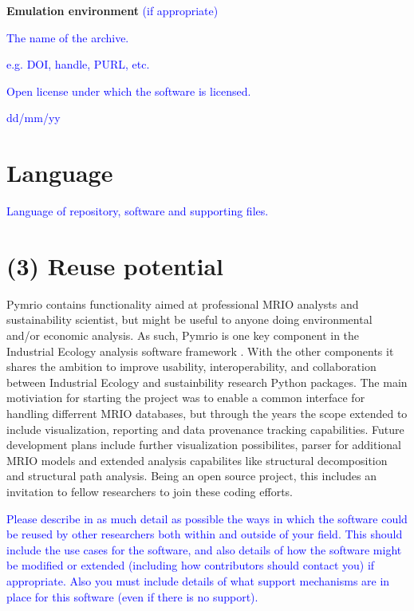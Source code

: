 \documentclass{jors}
\begin{document}
{{\bf Emulation environment} \textcolor{blue}{(if appropriate)}

\begin{description}[noitemsep,topsep=0pt]
	\item[Name:] \textcolor{blue}{The name of the archive.}
	\item[Persistent identifier:] \textcolor{blue}{e.g. DOI, handle, PURL, etc.}
	\item[Licence:] \textcolor{blue}{Open license under which the software is licensed.}
	\item[Date published:] \textcolor{blue}{dd/mm/yy}
\end{description}

\section*{Language}

\textcolor{blue}{Language of repository, software and supporting files.}

\section*{(3) Reuse potential}

Pymrio contains functionality aimed at professional MRIO analysts and sustainability scientist, but might be useful to anyone doing environmental and/or economic analysis. 
As such, Pymrio is one key component in the Industrial Ecology analysis software framework \cite{pauliuk2015}.
With the other components it shares the ambition to improve usability, interoperability, and collaboration between Industrial Ecology and sustainbility research Python packages.
The main motiviation for starting the project was to enable a common interface for handling differrent MRIO databases, but through the years the scope extended to include visualization, reporting and data provenance tracking capabilities.
Future development plans include further visualization possibilites, parser for additional MRIO models and extended analysis capabilites like structural decomposition and structural path analysis.
Being an open source project, this includes an invitation to fellow researchers to join these coding efforts.



\textcolor{blue}{Please describe in as much detail as possible the ways in which the software could be reused by other researchers both within and outside of your field. This should include the use cases for the software, and also details of how the software might be modified or extended (including how contributors should contact you) if appropriate. Also you must include details of what support mechanisms are in place for this software (even if there is no support).}

}
\end{document}
